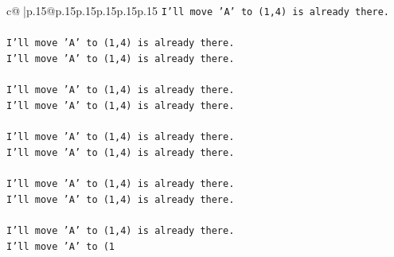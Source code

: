 \documentclass{article}
\begin{document}
{\begin{supertabular}{c@{$\;$}|p{.15\linewidth}@{}p{.15\linewidth}p{.15\linewidth}p{.15\linewidth}p{.15\linewidth}p{.15\linewidth}}
{{{\texttt{I'll move 'A' to (1,4) is already there.} \\
\\ 
\texttt{I'll move 'A' to (1,4) is already there.} \\
\texttt{I'll move 'A' to (1,4) is already there.} \\
\\ 
\texttt{I'll move 'A' to (1,4) is already there.} \\
\texttt{I'll move 'A' to (1,4) is already there.} \\
\\ 
\texttt{I'll move 'A' to (1,4) is already there.} \\
\texttt{I'll move 'A' to (1,4) is already there.} \\
\\ 
\texttt{I'll move 'A' to (1,4) is already there.} \\
\texttt{I'll move 'A' to (1,4) is already there.} \\
\\ 
\texttt{I'll move 'A' to (1,4) is already there.} \\
\texttt{I'll move 'A' to (1} \\
            }
        }
    }
     \\ \\


\end{supertabular}}
\end{document}
